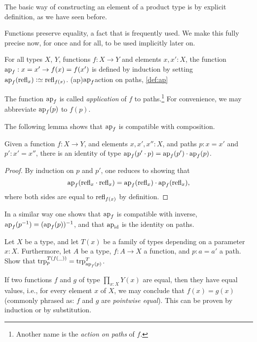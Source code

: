 The basic way of constructing an element of a product type
is by explicit definition, as we have seen before.

Functions preserve equality, a fact that is frequently used.
We make this fully precise now, for once and for all, 
to be used implicitly later on.

\begin{definition}\label{def:ap}
For all types $X$, $Y$, functions $f:X\to Y$ and elements $x,x':X$, the function
$\ap{f} : x = x' \to f(x) = f(x')$ is defined by induction by setting 
$\ap{f}(\refl{x})\defeq\refl{f(x)}$.%
\glossary(ap){$\protect\ap{f}$}{action on paths, \cref{def:ap}}
\end{definition}

The function $\ap f$ is called \emph{application} of $f$ to paths.\footnote{%
  Another name is the \emph{action on paths} of $f$.}
For convenience, we may abbreviate $\ap f (p)$ to $f(p)$.

The following lemma shows that $\ap f$ is compatible with composition.

\begin{lemma}\label{lem:apcomp}
  Given a function $f:X\to Y$, and elements $x,x',x'':X$, and paths $p : x = x'$ and $p' : x' = x''$,
  there is an identity of type $\ap f (p' \cdot p) =  \ap f (p') \cdot  \ap f (p)$.
\end{lemma}

\begin{proof}
  By induction on $p$ and $p'$, one reduces to showing that
  \[
    \ap f (\refl x \cdot \refl x) =  \ap f ( \refl x ) \cdot  \ap f ( \refl x ),
  \]
  where both sides are equal to $\mathrm{refl}_{ f(x) }$ by definition.
\end{proof}

In a similar way one shows that $\ap f$ is compatible with inverse,
$\ap f(p^{-1}) =  (\ap f (p))^{-1}$, and that $\ap \id$ is the identity on paths.


\begin{xca}\label{xca:trp-ap}
Let $X$ be a type, and let $T(x)$ be a family of types depending on a
parameter $x:X$. Furthermore, let $A$ be a type, $f:A\to X$ a function, 
and $p: a=a'$ a path. Show that $\trp[T(f(\_))]{p} = \trp[T]{\ap{f}(p)}$. 
\end{xca}

If two functions $f$ and $g$ of type $\prod_{x:X} Y(x)$ are equal, 
then they have equal values, i.e., for every element $x$ of $X$, 
we may conclude that $f(x) = g(x)$ (commonly phrased as:
$f$ and $g$ are \emph{pointwise equal}).
This can be proven by induction or by substitution.

